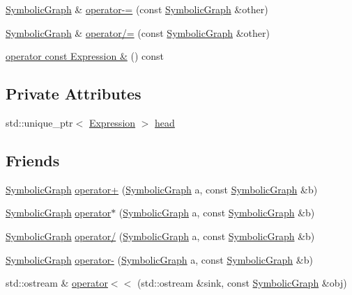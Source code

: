\begin{DoxyCompactItemize}
\item 
\hyperlink{classsymcpp_1_1SymbolicGraph}{Symbolic\+Graph} \& \hyperlink{classsymcpp_1_1SymbolicGraph_a190dea96dae8a94610f070364f50a238}{operator-\/=} (const \hyperlink{classsymcpp_1_1SymbolicGraph}{Symbolic\+Graph} \&other)
\item 
\hyperlink{classsymcpp_1_1SymbolicGraph}{Symbolic\+Graph} \& \hyperlink{classsymcpp_1_1SymbolicGraph_a5fc368abfd149228c614d63fd8ead1a0}{operator/=} (const \hyperlink{classsymcpp_1_1SymbolicGraph}{Symbolic\+Graph} \&other)
\item 
\hyperlink{classsymcpp_1_1SymbolicGraph_a541be663756ebab59c78a0cdbf8d534f}{operator const Expression \&} () const 
\end{DoxyCompactItemize}
\subsection*{Private Attributes}
\begin{DoxyCompactItemize}
\item 
std\+::unique\+\_\+ptr$<$ \hyperlink{classsymcpp_1_1Expression}{Expression} $>$ \hyperlink{classsymcpp_1_1SymbolicGraph_af7dd748252d7298792ff6329036de642}{head}
\end{DoxyCompactItemize}
\subsection*{Friends}
\begin{DoxyCompactItemize}
\item 
\hyperlink{classsymcpp_1_1SymbolicGraph}{Symbolic\+Graph} \hyperlink{classsymcpp_1_1SymbolicGraph_aefac47289460c9fb34141bd2a20809f1}{operator+} (\hyperlink{classsymcpp_1_1SymbolicGraph}{Symbolic\+Graph} a, const \hyperlink{classsymcpp_1_1SymbolicGraph}{Symbolic\+Graph} \&b)
\item 
\hyperlink{classsymcpp_1_1SymbolicGraph}{Symbolic\+Graph} \hyperlink{classsymcpp_1_1SymbolicGraph_a895a3848ca9605036f07e73412b8493b}{operator$\ast$} (\hyperlink{classsymcpp_1_1SymbolicGraph}{Symbolic\+Graph} a, const \hyperlink{classsymcpp_1_1SymbolicGraph}{Symbolic\+Graph} \&b)
\item 
\hyperlink{classsymcpp_1_1SymbolicGraph}{Symbolic\+Graph} \hyperlink{classsymcpp_1_1SymbolicGraph_a75795007fbed7da119eb3ed6838c341e}{operator/} (\hyperlink{classsymcpp_1_1SymbolicGraph}{Symbolic\+Graph} a, const \hyperlink{classsymcpp_1_1SymbolicGraph}{Symbolic\+Graph} \&b)
\item 
\hyperlink{classsymcpp_1_1SymbolicGraph}{Symbolic\+Graph} \hyperlink{classsymcpp_1_1SymbolicGraph_af0e10f19ffb94557b68c8f10b110f030}{operator-\/} (\hyperlink{classsymcpp_1_1SymbolicGraph}{Symbolic\+Graph} a, const \hyperlink{classsymcpp_1_1SymbolicGraph}{Symbolic\+Graph} \&b)
\item 
std\+::ostream \& \hyperlink{classsymcpp_1_1SymbolicGraph_a653fedc6ac7ca152b1d40ad887b9af42}{operator$<$$<$} (std\+::ostream \&sink, const \hyperlink{classsymcpp_1_1SymbolicGraph}{Symbolic\+Graph} \&obj)
\end{DoxyCompactItemize}


